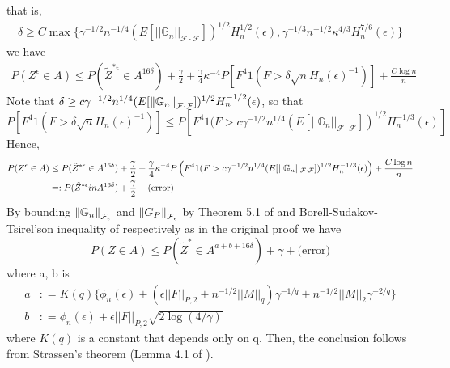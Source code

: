 \documentclass{article}
\begin{document}
 that is, 
\begin{align*}
    \delta \geq C \max \{ \gamma^{-1/2}n ^{-1/4} ( E[ ||\mathbb{G}_n|| _ {\mathcal{F}\cdot \mathcal{F}}])^{1/2} H_n^{1/2}  (\epsilon) , \gamma^{-1/3} n^{-1/2} \kappa^{4/3} H_n ^{7/6} ( \epsilon) \}
\end{align*} 
we have 
\begin{align*}
    P(Z^\epsilon \in A) \leq P( \tilde{Z}^{ * \epsilon} \in A^{16 \delta}) + \frac{\gamma}{2} + \frac{\gamma}{4} \kappa^{-4} P[ F^4 1 ( F > \delta \sqrt{n} H_n ( \epsilon)^{-1}) ] + \frac{C \log n }{n} 
\end{align*}
Note that $ \delta \geq c \gamma^{-1/2}n ^{1/4} ( E[ \norm{\mathbb{G}_n} _ {\mathcal{F}\cdot \mathcal{F}}])^{1/2} H_n^{-1/2}  (\epsilon) $, so that 
\begin{equation*}
    P[ F^4 1(F > \delta \sqrt{n} H_n (\epsilon)^{-1})] \leq P[ F^4 1( F > c \gamma^{-1/2} n^{1/4} ( E[ || \mathbb{G}_n||_{\mathcal{F} \cdot \mathcal{F}}])^{1/2} H_n^{- 1/3}(\epsilon) ]
\end{equation*}
Hence,
\begin{align*}
    P(Z^\epsilon \in A) &\leq P( \tilde{Z}^{ * \epsilon} \in A^{16 \delta}) + \frac{\gamma}{2} + \frac{\gamma}{4} \kappa^{-4}  P\left( F^4 1( F > c \gamma^{-1/2} n^{1/4} ( E[ || \mathbb{G}_n||_{\mathcal{F} \cdot \mathcal{F}}])^{1/2} H_n^{- 1/3}(\epsilon)\right) + \frac{C \log n }{n} \\
    &=: P( \tilde{Z}^{* \epsilon} in A^{16 \delta}) + \frac{\gamma}{2} + \text{(error)} 
\end{align*}
By bounding $\norm{\mathbb{G}_n}_{\mathcal{F}_\epsilon} $ and $ \norm{G_P}_{\mathcal{F}_\epsilon}$ by Theorem 5.1 of \cite{citechern sup } and Borell-Sudakov-Tsirel'son inequality of \cite{citevanderwellner} respectively as in the original proof we have
\begin{equation*}
    P(Z \in A) \leq P( \tilde{Z}^{*} \in A^{a + b + 16 \delta}) + \gamma + \text{(error)} 
\end{equation*}
where a, b is 
\begin{align*}
    a&: = K(q) \{ \phi_n ( \epsilon) + ( \epsilon ||F||_{P,2} + n^{-1/2} || M||_q ) \gamma^{-1/q} + n^{-1/2} || M|| _2 \gamma^{-2/q} \} \\
    b&: = \phi_n (\epsilon) + \epsilon || F||_{P,2} \sqrt{ 2 \log( 4/ \gamma)}
\end{align*}
where $K(q)$ is a constant that depends only on q. 
Then, the conclusion follows from Strassen's theorem (Lemma 4.1 of \cite{cite chern supre}).
\end{document}
